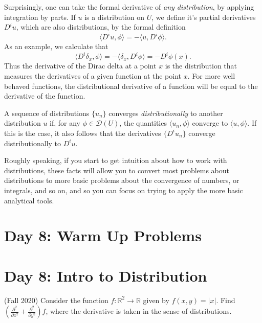 \documentclass[answers]{exam}
\theoremstyle{problemstyle}
\newcommand{\1}[1]{\textbf{1}_{\left[#1\right]}} %
\def\R{\mathbb{R}} %
\begin{document}
\begin{questions}
Surprisingly, one can take the formal derivative of \emph{any distribution}, by applying integration by parts. If $u$ is a distribution on $U$, we define it's partial derivatives $D^i u$, which are also distributions, by the formal definition
%
\[ \langle D^i u, \phi \rangle = - \langle u, D^i \phi \rangle. \]
%
As an example, we calculate that
%
\[ \langle D^i \delta_x, \phi \rangle = - \langle \delta_x, D^i \phi \rangle = - D^i \phi(x). \]
%
Thus the derivative of the Dirac delta at a point $x$ is the distribution that measures the derivatives of a given function at the point $x$. For more well behaved functions, the distributional derivative of a function will be equal to the derivative of the function.

A sequence of distributions $\{ u_n \}$ converges \emph{distributionally} to another distribution $u$ if, for any $\phi \in \mathcal{D}(U)$, the quantities $\langle u_n, \phi \rangle$ converge to $\langle u, \phi \rangle$. If this is the case, it also follows that the derivatives $\{ D^i u_n \}$ converge distributionally to $D^i u$.

Roughly speaking, if you start to get intuition about how to work with distributions, these facts will allow you to convert most problems about distributions to more basic problems about the convergence of numbers, or integrals, and so on, and so you can focus on trying to apply the more basic analytical tools.






\newpage
\section*{Day 8: Warm Up Problems}

\newpage
\section{Day 8: Intro to Distribution}

\item (Fall 2020)
Consider the function $f:\R^{2}\to \R$ given by $f(x,y)=|x|$. Find $\left( \frac{\partial ^{2}}{\partial x^{2}}+ \frac{\partial ^{2}}{\partial y^{2}} \right)f$, where the derivative is taken in the sense of distributions.


\end{questions}
\end{document}
